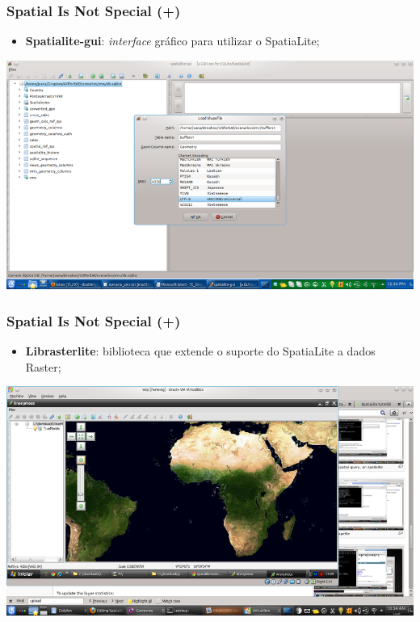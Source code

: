 \documentclass[hyperref={pdfpagelabels=true}]{beamer}
\begin{document}
\begin{frame}
\frametitle{Spatial Is Not Special (+)}
    \begin{itemize}
      \item<1-> \textbf{Spatialite-gui}: \textit{interface} gr\'{a}fico para utilizar o SpatiaLite;
    \end{itemize}
  \includegraphics[scale=0.4]{spatialite_gui.png}        
\end{frame}

\begin{frame}
\frametitle{Spatial Is Not Special (+)}
    \begin{itemize}
      \item<1-> \textbf{Librasterlite}: biblioteca que extende o suporte do SpatiaLite a dados Raster;
    \end{itemize}
  \includegraphics[scale=0.4]{rasterlite.png}        
\end{frame}
\end{document}
